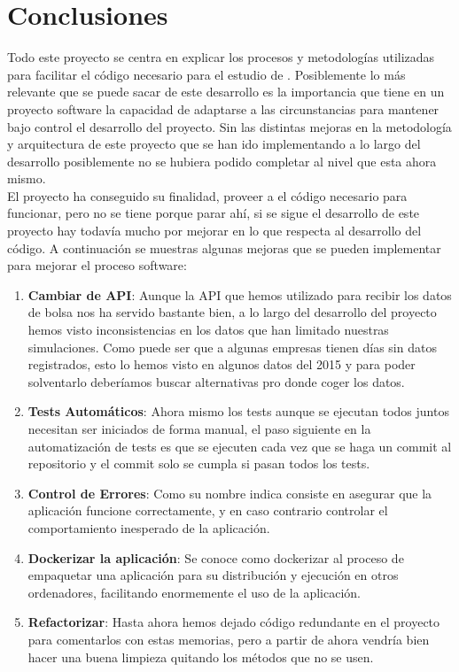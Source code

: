 \documentclass[12pt,a4paper]{article}
\begin{document}
	\section{Conclusiones}
	Todo este proyecto se centra en explicar los procesos y metodologías utilizadas para facilitar el código necesario para el estudio de \cite{Principal}. Posiblemente lo más relevante que se puede sacar de este desarrollo es la importancia que tiene en un proyecto software la capacidad de adaptarse a las circunstancias para mantener bajo control el desarrollo del proyecto. Sin las distintas mejoras en la metodología y arquitectura de este proyecto que se han ido implementando a lo largo del desarrollo posiblemente no se hubiera podido completar al nivel que esta ahora mismo.\\
	El proyecto ha conseguido su finalidad, proveer a \cite{Principal} el código necesario para funcionar, pero no se tiene porque parar ahí, si se sigue el desarrollo de este proyecto hay todavía mucho por mejorar en lo que respecta al desarrollo del código. A continuación se muestras algunas mejoras que se pueden implementar para mejorar el proceso software:\\
	\begin{enumerate}
	\item \textbf{Cambiar de API}: Aunque la API que hemos utilizado para recibir los datos de bolsa nos ha servido bastante bien, a lo largo del desarrollo del proyecto hemos visto inconsistencias en los datos que han limitado nuestras simulaciones. Como puede ser que a algunas empresas tienen días sin datos registrados, esto lo hemos visto en algunos datos del 2015 y para poder solventarlo deberíamos buscar alternativas pro donde coger los datos.
	\item \textbf{Tests Automáticos}: Ahora mismo los tests aunque se ejecutan todos juntos necesitan ser iniciados de forma manual, el paso siguiente en la automatización de tests es que se ejecuten cada vez que se haga un commit al repositorio y el commit solo se cumpla si pasan todos los tests.
	\item \textbf{Control de Errores}: Como su nombre indica consiste en asegurar que la aplicación funcione correctamente, y en caso contrario controlar el comportamiento inesperado de la aplicación.
	\item \textbf{Dockerizar la aplicación}: Se conoce como dockerizar al proceso de empaquetar una aplicación para su distribución y ejecución en otros ordenadores, facilitando enormemente el uso de la aplicación.
	\item \textbf{Refactorizar}: Hasta ahora hemos dejado código redundante en el proyecto para comentarlos con estas memorias, pero a partir de ahora vendría bien hacer una buena limpieza quitando los métodos que no se usen.
	\end{enumerate}
\end{document}
